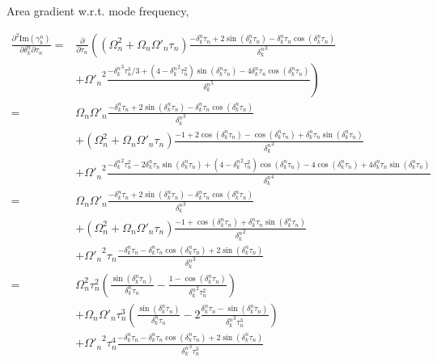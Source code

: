 \documentclass[10pt,fleqn]{article}
\newcommand{\eqar}[1]
{
  \begin{align*}
    #1
  \end{align*}
}
\newcommand{\paren}[1]{{\left({#1}\right)}}
\newcommand{\lparen}[1]{{\left({#1}\right.}}
\newcommand{\rparen}[1]{{\left.{#1}\right)}}
\newcommand{\pdiff}[3][{}]{{\frac{\partial^{#1} {#2}}{\partial {#3}{}^{#1}}}}
\begin{document}
Area gradient w.r.t. mode frequency,
\eqar{
  \frac{\partial^2\mathrm{Im}\paren{\gamma_k^n}}{\partial\delta_k^n\partial\tau_n}=&
  \pdiff{}{\tau_n}\lparen{
    \paren{\Omega_n^2+\Omega_n\Omega'_n\tau_n}
    \frac{-\delta_k^n\tau_n+2\sin\paren{{\delta_k^n}\tau_n}-{\delta_k^n}\tau_n\cos\paren{{\delta_k^n}\tau_n}}{{\delta_k^n}^3}
  }\\
  &\rparen{+{\Omega'_n}^2\frac{
      -{\delta_k^n}^3\tau_n^3/3
      +\paren{4-{\delta_k^n}^2\tau_n^2}\sin\paren{{\delta_k^n}\tau_n}
      -4{\delta_k^n}\tau_n\cos\paren{{\delta_k^n}\tau_n}
    }{{\delta_k^n}^5}
  }\\
  =&\Omega_n\Omega'_n\frac{-\delta_k^n\tau_n+2\sin\paren{{\delta_k^n}\tau_n}-{\delta_k^n}\tau_n\cos\paren{{\delta_k^n}\tau_n}}{{\delta_k^n}^3}
  \\
  &+\paren{\Omega_n^2+\Omega_n\Omega'_n\tau_n}
  \frac{-1+2\cos\paren{{\delta_k^n}\tau_n}
    -\cos\paren{{\delta_k^n}\tau_n}
    +{\delta_k^n}\tau_n\sin\paren{{\delta_k^n}\tau_n}
  }{{\delta_k^n}^2}
  \\
  &+{\Omega'_n}^2\frac{
    -{\delta_k^n}^2\tau_n^2
    -2{\delta_k^n}\tau_n\sin\paren{{\delta_k^n}\tau_n}
    +\paren{4-{\delta_k^n}^2\tau_n^2}\cos\paren{{\delta_k^n}\tau_n}
    -4\cos\paren{{\delta_k^n}\tau_n}
    +4{\delta_k^n}\tau_n\sin\paren{{\delta_k^n}\tau_n}
  }{{\delta_k^n}^4}
  \\
  =&\Omega_n\Omega'_n\frac{-\delta_k^n\tau_n+2\sin\paren{{\delta_k^n}\tau_n}-{\delta_k^n}\tau_n\cos\paren{{\delta_k^n}\tau_n}}{{\delta_k^n}^3}
  \\
  &+\paren{\Omega_n^2+\Omega_n\Omega'_n\tau_n}
  \frac{-1
    +\cos\paren{{\delta_k^n}\tau_n}
    +{\delta_k^n}\tau_n\sin\paren{{\delta_k^n}\tau_n}
  }{{\delta_k^n}^2}
  \\
  &+{\Omega'_n}^2\tau_n\frac{
    -{\delta_k^n}\tau_n
    -{\delta_k^n}\tau_n\cos\paren{{\delta_k^n}\tau_n}
    +2\sin\paren{{\delta_k^n}\tau_n}
  }{{\delta_k^n}^3}
  \\
  =&\Omega_n^2\tau_n^2\paren{
    \frac{\sin\paren{{\delta_k^n}\tau_n}}{{\delta_k^n}\tau_n}
    -\frac{1-\cos\paren{{\delta_k^n}\tau_n}}{{\delta_k^n}^2\tau_n^2}
  }
  \\
  &+\Omega_n\Omega'_n\tau_n^3\paren{
    \frac{\sin\paren{{\delta_k^n}\tau_n}}{{\delta_k^n}\tau_n}
    -2\frac{{\delta_k^n}\tau_n-\sin\paren{{\delta_k^n}\tau_n}}{{\delta_k^n}^3\tau_n^3}
  }
  \\
  &+{\Omega'_n}^2\tau_n^4\frac{
    -{\delta_k^n}\tau_n
    -{\delta_k^n}\tau_n\cos\paren{{\delta_k^n}\tau_n}
    +2\sin\paren{{\delta_k^n}\tau_n}
  }{{\delta_k^n}^3\tau_n^3}
}
\end{document}
